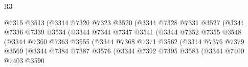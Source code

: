 \begin{lexlean}{R3}
\begin{coremodule}
                                        @7315
                                        @3513
                                        (@3344
                                          @7320
                                          @7323
                                          @3520
                                          (@3344
                                            @7328
                                            @7331
                                            @3527
                                            (@3344
                                              @7336
                                              @7339
                                              @3534
                                              (@3344
                                                @7344
                                                @7347
                                                @3541
                                                (@3344
                                                  @7352
                                                  @7355
                                                  @3548
                                                  (@3344
                                                    @7360
                                                    @7363
                                                    @3555
                                                    (@3344
                                                      @7368
                                                      @7371
                                                      @3562
                                                      (@3344
                                                        @7376
                                                        @7379
                                                        @3569
                                                        (@3344
                                                          @7384
                                                          @7387
                                                          @3576
                                                          (@3344
                                                            @7392
                                                            @7395
                                                            @3583
                                                            (@3344
                                                              @7400
                                                              @7403
                                                              @3590

\end{coremodule}
\end{lexlean}

